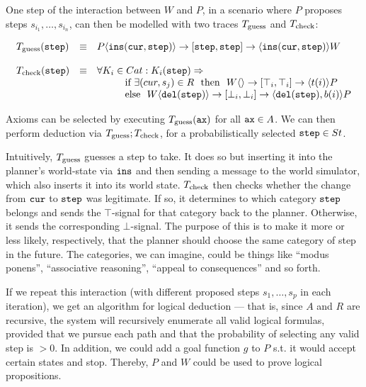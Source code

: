 One step of the interaction between $W$ and $P$, in a scenario where $P$ proposes steps $s_{i_1},\dots,s_{i_n}$, can then be modelled with two traces $T_{\mt{guess}}$ and $T_{\mt{check}}$:

$$
	\begin{array}{l l l}
		T_{\mt{guess}}(\tt{step}) & \equiv & \sendsf{P}{\tt{ins}(\tt{cur}, \tt{step})}{\tt{step}}{\tt{step}}{\tt{ins}(\tt{cur}, \tt{step})}{W}\\
		\\
		T_{\mt{check}}(\tt{step}) & \equiv &
		\forall K_i \in Cat: K_i(\tt{step}) \Rightarrow\\
		
		& & \hspace{1cm} \mt{if } \exists (cur, s_j) \in R\ \mt{ then } \
					\sendsf{W}{}{\top_i}{\top_i}{t(i)}{P}\\
		& & \hspace{1cm} \mt{else }\ \sendsf{W}{\tt{del}(\tt{step})}{\bot_i}{\bot_i}{\tt{del}(\tt{step}), b(i)}{P}\\
	\end{array}
$$

\medskip

Axioms can be selected by executing $T_{\mt{guess}}(\tt{ax})$ for all $\tt{ax} \in A$. We can then perform deduction via $T_{\mt{guess}};T_{\mt{check}}$, for a probabilistically selected $\tt{step} \in St$.

Intuitively, $T_{\mt{guess}}$ guesses a step to take. It does so but inserting it into the planner's world-state via $\tt{ins}$ and then sending a message to the world simulator, which also inserts it into its world state. $T_{\mt{check}}$ then checks whether the change from $\tt{cur}$ to $\tt{step}$ was legitimate. If so, it determines to which category $\tt{step}$ belongs and sends the $\top$-signal for that category back to the planner. Otherwise, it sends the corresponding $\bot$-signal. The purpose of this is to make it more or less likely, respectively, that the planner should choose the same category of step in the future. The categories, we can imagine, could be things like ``modus ponens'', ``associative reasoning'', ``appeal to consequences'' and so forth.

If we repeat this interaction (with different proposed steps $s_1,\dots,s_p$ in each iteration), we get an algorithm for logical deduction  --- that is, since $A$ and $R$ are recursive, the system will recursively enumerate all valid logical formulas, provided that we pursue each path and that the probability of selecting any valid step is $> 0$. In addition, we could add a goal function $g$ to $P$ s.t. it would accept certain states and stop. Thereby, $P$ and $W$ could be used to prove logical propositions.

